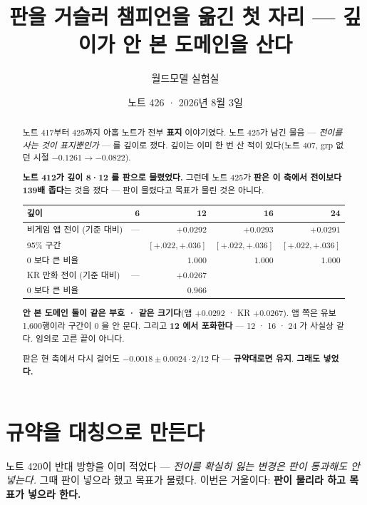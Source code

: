 \documentclass[11pt]{article}
\begin{document}
\title{판을 거슬러 챔피언을 옮긴 첫 자리 --- 깊이가 안 본 도메인을 산다}
\author{월드모델 실험실}
\date{노트 426 · 2026년 8월 3일}
\maketitle

\begin{abstract}
노트 417부터 425까지 아홉 노트가 전부 \textbf{표지} 이야기였다. 노트 425가
남긴 물음 --- \emph{전이를 사는 것이 표지뿐인가} --- 를 깊이로 쟀다. 깊이는
이미 한 번 산 적이 있다(노트 407, grp 없던 시절 $-0.1261 \to -0.0822$).

\textbf{노트 412가 깊이 8·12 를 판으로 물렸었다.} 그런데 노트 425가
\textbf{판은 이 축에서 전이보다 139배 좁다}는 것을 쟀다 --- 판이 물렸다고
목표가 물린 것은 아니다.

\begin{center}
\begin{tabular}{lrrrr}
\hline
깊이 & 6 & 12 & 16 & 24 \\
\hline
비게임 앱 전이 (기준 대비) & --- & $+0.0292$ & $+0.0293$ & $+0.0291$ \\
95\% 구간 & & $[+.022,+.036]$ & $[+.022,+.036]$ & $[+.022,+.036]$ \\
0 보다 큰 비율 & & $1.000$ & $1.000$ & $1.000$ \\
\hline
KR 만화 전이 (기준 대비) & --- & $+0.0267$ & & \\
0 보다 큰 비율 & & $0.966$ & & \\
\hline
\end{tabular}
\end{center}

\textbf{안 본 도메인 둘이 같은 부호 · 같은 크기다}(앱 $+0.0292$ · KR
$+0.0267$). 앱 쪽은 유보 1{,}600행이라 구간이 0 을 안 문다. 그리고
\textbf{12 에서 포화한다} --- 12 · 16 · 24 가 사실상 같다. 임의로 고른
끝이 아니다.

판은 현 축에서 다시 걸어도 $-0.0018 \pm 0.0024 \cdot 2/12$ 다 ---
\textbf{규약대로면 유지}. \textbf{그래도 넣었다.}
\end{abstract}

\section{규약을 대칭으로 만든다}

노트 420이 반대 방향을 이미 적었다 --- \emph{전이를 확실히 잃는 변경은
판이 통과해도 안 넣는다.} 그때 판이 넣으라 했고 목표가 물렸다. 이번은
거울이다: \textbf{판이 물리라 하고 목표가 넣으라 한다.}
\end{document}
